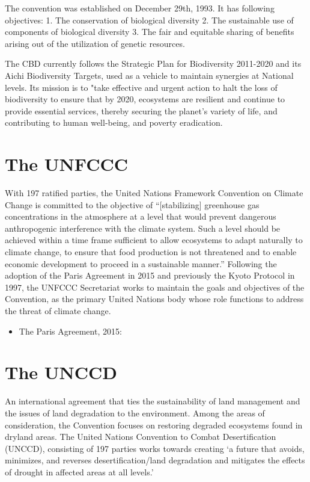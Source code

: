 \documentclass[
  openany]{book}
\providecommand{\tightlist}{%
  \setlength{\itemsep}{0pt}\setlength{\parskip}{0pt}}
\begin{document}
The convention was established on December 29th, 1993. It has following objectives:
1. The conservation of biological diversity
2. The sustainable use of components of biological diversity
3. The fair and equitable sharing of benefits arising out of the utilization of genetic resources.

The CBD currently follows the Strategic Plan for Biodiversity 2011-2020 and its Aichi Biodiversity Targets, used as a vehicle to maintain synergies at National levels. Its mission is to "take effective and urgent action to halt the loss of biodiversity to ensure that by 2020, ecosystems are resilient and continue to provide essential services, thereby securing the planet's variety of life, and contributing to human well-being, and poverty eradication.

\hypertarget{the-unfccc}{%
\section{The UNFCCC}\label{the-unfccc}}

With 197 ratified parties, the United Nations Framework Convention on Climate Change is committed to the objective of ``{[}stabilizing{]} greenhouse gas concentrations in the atmosphere at a level that would prevent dangerous anthropogenic interference with the climate system. Such a level should be achieved within a time frame sufficient to allow ecosystems to adapt naturally to climate change, to ensure that food production is not threatened and to enable economic development to proceed in a sustainable manner.'' Following the adoption of the Paris Agreement in 2015 and previously the Kyoto Protocol in 1997, the UNFCCC Secretariat works to maintain the goals and objectives of the Convention, as the primary United Nations body whose role functions to address the threat of climate change.

\begin{itemize}
\tightlist
\item
  The Paris Agreement, 2015:
\end{itemize}

\hypertarget{the-unccd}{%
\section{The UNCCD}\label{the-unccd}}

An international agreement that ties the sustainability of land management and the issues of land degradation to the environment. Among the areas of consideration, the Convention focuses on restoring degraded ecosystems found in dryland areas. The United Nations Convention to Combat Desertification (UNCCD), consisting of 197 parties works towards creating `a future that avoids, minimizes, and reverses desertification/land degradation and mitigates the effects of drought in affected areas at all levels.'
\end{document}
